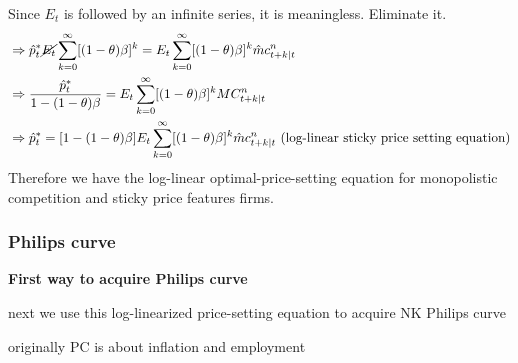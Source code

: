 \documentclass{article}
\begin{document}
Since $E_t$ is followed by an infinite series, it is meaningless. Eliminate it.
\begin{align}
& \Rightarrow \hat p_{t}^{*} \cancel{E_{t}}\sum\limits_{k=0}^{\infty}[(1-\theta)\beta]^{k}=E_{t}\sum\limits_{k=0}^{\infty}[(1-\theta)\beta]^{k} \hat mc^n_{t+k|t}
\\& \Rightarrow \frac{\hat p_t^*}{1-(1-\theta)\beta}=E_{t}\sum\limits_{k=0}^{\infty}[(1-\theta)\beta]^{k}MC^n_{t+k|t}
\\& \Rightarrow \hat p_t^* =[1-(1-\theta)\beta]E_{t}\sum\limits_{k=0}^{\infty}[(1-\theta)\beta]^{k} \hat mc^n_{t+k|t} \text{ (log-linear sticky price setting equation)}
\end{align}
Therefore we have the log-linear optimal-price-setting equation for monopolistic competition and sticky price features firms.


\subsubsection{Philips curve}

\textbf{First way to acquire Philips curve}

next we use this log-linearized price-setting equation to acquire NK Philips curve

originally PC is about inflation and employment
\end{document}
